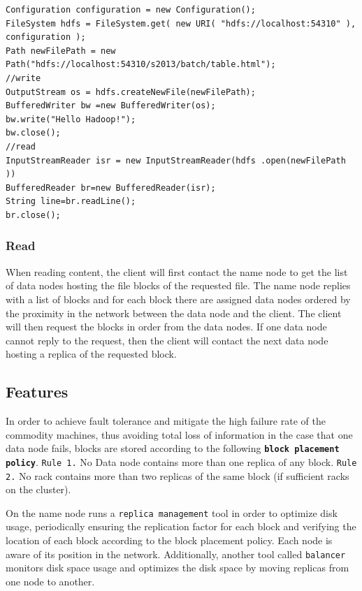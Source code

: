 \documentclass{sig-alternate}
\begin{document}
\begin{lstlisting}[basicstyle=\footnotesize\tt, frame=single, float=*, label={lst:hdfs-write},caption=HDFS Write and Read]
Configuration configuration = new Configuration();
FileSystem hdfs = FileSystem.get( new URI( "hdfs://localhost:54310" ), configuration );
Path newFilePath = new Path("hdfs://localhost:54310/s2013/batch/table.html");
//write
OutputStream os = hdfs.createNewFile(newFilePath);
BufferedWriter bw =new BufferedWriter(os);
bw.write("Hello Hadoop!");
bw.close();
//read
InputStreamReader isr = new InputStreamReader(hdfs .open(newFilePath ))
BufferedReader br=new BufferedReader(isr); 
String line=br.readLine();
br.close();
\end{lstlisting}

\subsubsection{Read}
When reading content, the client will first contact the name node to get the list of data nodes hosting the file blocks of the requested file. The name node replies with a list of blocks and for each block there are assigned data nodes ordered by the proximity in the network between the data node and the client. 
The client will then request the blocks in order from the data nodes. If one data node cannot reply to the request, then the client will contact the next data node hosting a replica of the requested block.

\subsection{Features}
In order to achieve fault tolerance and mitigate the high failure rate of the commodity machines, thus avoiding total loss of information in the case that one data node fails, blocks are stored according to the following \textbf{\texttt{block placement policy}}.
\texttt{Rule 1.} No Data node contains more than one replica of any block. \texttt{Rule 2.} No rack contains more than two replicas of the same block (if sufficient racks on the cluster).

On the name node runs a \texttt{replica management} tool in order to optimize disk usage, periodically ensuring the replication factor for each block and verifying the location of each block according to the block placement policy. Each node is aware of its position in the network.
Additionally, another tool called \texttt{balancer} monitors disk space usage and optimizes the disk space by moving replicas from one node to another.
\end{document}
